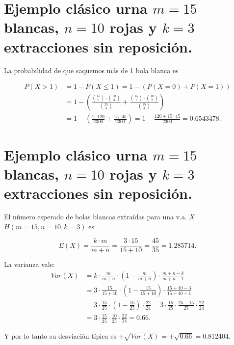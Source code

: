 \documentclass[
  letterpaper,
  DIV=11,
  numbers=noendperiod]{scrreprt}
\begin{document}
\section{\texorpdfstring{Ejemplo clásico urna \(m=15\) blancas, \(n=10\)
rojas y \(k=3\) extracciones sin
reposición.}{Ejemplo clásico urna m=15 blancas, n=10 rojas y k=3 extracciones sin reposición.}}\label{ejemplo-cluxe1sico-urna-m15-blancas-n10-rojas-y-k3-extracciones-sin-reposiciuxf3n.-2}

La probabilidad de que saquemos más de 1 bola blanca es

\[
\begin{array}{rl}
P(X> 1)&= 1-P(X\leq 1)=1-(P(X=0)+P(X=1))\\
&=
1-\left(\frac{\binom{15}{0}\cdot \binom{10}{3}}{\binom{25}{3}}+
\frac{\binom{15}{1}\cdot \binom{10}{2}}{\binom{25}{3}}\right)\\
&=
1-\left(
\frac{1\cdot120 }{2300}+\frac{15\cdot45 }{2300}
\right)=1-\frac{120+15\cdot 45}{2300}=0.6543478.
\end{array}
\]

\section{\texorpdfstring{Ejemplo clásico urna \(m=15\) blancas, \(n=10\)
rojas y \(k=3\) extracciones sin
reposición.}{Ejemplo clásico urna m=15 blancas, n=10 rojas y k=3 extracciones sin reposición.}}\label{ejemplo-cluxe1sico-urna-m15-blancas-n10-rojas-y-k3-extracciones-sin-reposiciuxf3n.-3}

El número esperado de bolas blancas extraídas para una v.a. \(X\)
\(H(m=15,n=10,k=3)\) es

\[E(X)=\frac{k\cdot m}{m+n}=\frac{3\cdot 15}{15+10}=\frac{45}{35}=1.285714.\]

La varianza vale: \[
\begin{array}{rl}
Var(X)&=k\cdot\frac{m}{m+n}\cdot\left(1-\frac{m}{m+n}\right) \cdot\frac{m+n-k}{m+n-1}\\
&=3\cdot\frac{15}{15+10}\cdot\left(1-\frac{15}{15+10}\right) \cdot\frac{15+10-3}{15+10-1}\\
&=
3\cdot\frac{15}{25}\cdot\left(1-\frac{15}{25}\right) \cdot\frac{22}{24}= 
3\cdot\frac{15}{25}\cdot\frac{25-15}{25} \cdot\frac{22}{24}\\
&=
3\cdot\frac{15}{25}\cdot\frac{10}{25}\cdot\frac{22}{24}=0.66.
\end{array}
\]

Y por lo tanto su desviación típica es
\(+\sqrt{Var(X)}=+\sqrt{0.66}=0.812404.\)
\end{document}
